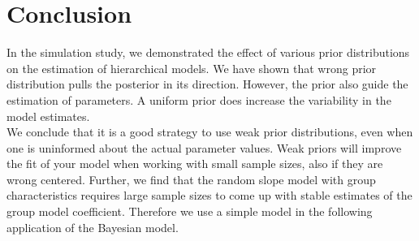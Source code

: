 \section{Conclusion}




In the simulation study, we demonstrated the effect of various prior distributions on the estimation of hierarchical models. 
We have shown that wrong prior distribution pulls the posterior in its direction. However, the prior also guide the estimation of parameters. A uniform prior does increase the variability in the model estimates. \\

We conclude that it is a good strategy to use weak prior distributions, even when one is uninformed about the actual parameter values. Weak priors will improve the fit of your model when working with small sample sizes, also if they are wrong centered.
Further, we find that the random slope model with group characteristics requires large sample sizes to come up with stable estimates of the group model coefficient. Therefore we use a simple model in the following application of the Bayesian model.